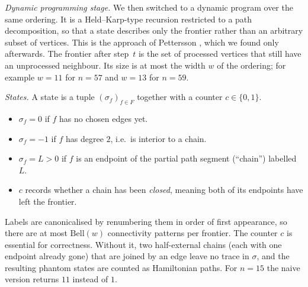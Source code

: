 \emph{Dynamic programming stage.} We then switched to a dynamic program over the same ordering.
It is a Held--Karp-type recursion \cite{Bellman,HeldKarp} restricted to a path decomposition, so
that a state describes only the frontier rather than an arbitrary subset of vertices. This is the
approach of Pettersson \cite{Pettersson}, which we found only afterwards. The frontier after
step~$t$ is the set of processed vertices that still have an unprocessed neighbour. Its size is at
most the width $w$ of the ordering; for example $w=11$ for $n=57$ and $w=13$ for $n=59$.

\emph{States.} A state is a tuple $(\sigma_f)_{f\in F}$ together with a counter $c\in\{0,1\}$.
\begin{itemize}
\item $\sigma_f=0$ if $f$ has no chosen edges yet.
\item $\sigma_f=-1$ if $f$ has degree $2$, i.e.\ is interior to a chain.
\item $\sigma_f=L>0$ if $f$ is an endpoint of the partial path segment (``chain'') labelled $L$.
\item $c$ records whether a chain has been \emph{closed}, meaning both of its endpoints have
left the frontier.
\end{itemize}
Labels are canonicalised by renumbering them in order of first appearance, so there are at most
$\mathrm{Bell}(w)$ connectivity patterns per frontier. The counter $c$ is essential for
correctness. Without it, two half-external chains (each with one endpoint already gone) that are
joined by an edge leave no trace in $\sigma$, and the resulting phantom states are counted as
Hamiltonian paths. For $n=15$ the naive version returns $11$ instead of $1$.

